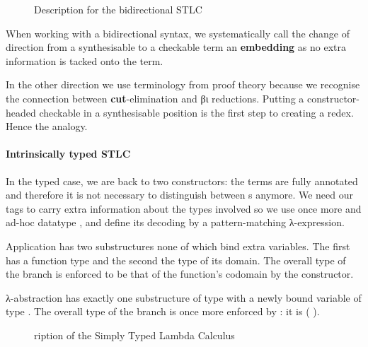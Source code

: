 \begin{figure}[h]
\noindent\begin{minipage}[t]{0.35\textwidth}
\end{minipage}
\begin{minipage}[t]{0.65\textwidth}
\end{minipage}
  \caption{Description for the bidirectional STLC\label{fig:descBidiSTLC}}
\end{figure}

\begin{convention}
When working with a bidirectional syntax, we systematically call the change
of direction from a synthesisable to a checkable term an \textbf{embedding}
as no extra information is tacked onto the term.

In the other direction we use terminology from proof theory because we recognise
the connection between \textbf{cut}-elimination and βι reductions. Putting a
constructor-headed checkable in a synthesisable position is the first step to
creating a redex. Hence the analogy.
\end{convention}

\paragraph{Intrinsically typed STLC}\label{par:intrinsicSTLC}
In the typed case, we are back to two
constructors: the terms are fully annotated and therefore it is not necessary
to distinguish between s anymore. We need our tags to carry extra
information about the types involved so we use once more and ad-hoc datatype
, and define its decoding  by a pattern-matching
λ-expression.

Application has two substructures none of which bind extra variables. The first
has a function type and the second the type of its domain. The overall type of
the branch is enforced to be that of the function's codomain by the 
constructor.

λ-abstraction has exactly one substructure of type  with a newly bound
variable of type . The overall type of the branch is once more enforced
by : it is (  ).

\begin{figure}[h]
\caption{ription of the Simply Typed Lambda Calculus\label{fig:descstlc}\label{fig:descSTLC}}
\end{figure}

